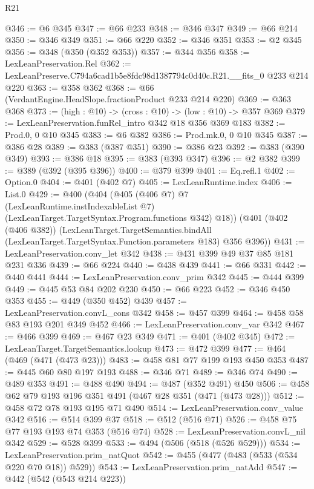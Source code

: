 \begin{lexlean}{R21}
\begin{coremodule}
@346 := @6 @345
@347 := @66 @233
@348 := @346 @347
@349 := @66 @214
@350 := @346 @349
@351 := @66 @220
@352 := @346 @351
@353 := @2 @345
@356 := @348 (@350 (@352 @353))
@357 := @344 @356
@358 := LexLeanPreservation.Rel
@362 := LexLeanPreserve.C794a6cad1b5e8fdc98d1387794c0d40c.R21.__fits_0 @233 @214 @220
@363 := @358 @362
@368 := @66 (VerdantEngine.HeadSlope.fractionProduct @233 @214 @220)
@369 := @363 @368
@373 := (high : @10) -> (cross : @10) -> (low : @10) -> @357 @369
@379 := LexLeanPreservation.funRel_intro @342 @18 @356 @369 @183
@382 := Prod.{0, 0} @10 @345
@383 := @6 @382
@386 := Prod.mk.{0, 0} @10 @345
@387 := @386 @28
@389 := @383 (@387 @351)
@390 := @386 @23
@392 := @383 (@390 @349)
@393 := @386 @18
@395 := @383 (@393 @347)
@396 := @2 @382
@399 := @389 (@392 (@395 @396))
@400 := @379 @399
@401 := Eq.refl.{1}
@402 := Option.{0}
@404 := @401 (@402 @7)
@405 := LexLeanRuntime.index
@406 := List.{0}
@429 := @400
    (@404
      (@405
        (@406 @7)
        @7
        (LexLeanRuntime.instIndexableList @7)
        (LexLeanTarget.TargetSyntax.Program.functions @342)
        @18))
    (@401
      (@402 (@406 @382))
      (LexLeanTarget.TargetSemantics.bindAll
        (LexLeanTarget.TargetSyntax.Function.parameters @183)
        @356
        @396))
@431 := LexLeanPreservation.conv_let @342
@438 := @431 @399 @49 @37 @85 @181 @231 @336
@439 := @66 @224
@440 := @438 @439
@441 := @66 @331
@442 := @440 @441
@444 := LexLeanPreservation.conv_prim @342
@445 := @444 @399
@449 := @445 @53 @84 @202 @230
@450 := @66 @223
@452 := @346 @450 @353
@455 := @449 (@350 @452) @439
@457 := LexLeanPreservation.convL_cons @342
@458 := @457 @399
@464 := @458 @58 @83 @193 @201 @349 @452
@466 := LexLeanPreservation.conv_var @342
@467 := @466 @399
@469 := @467 @23 @349
@471 := @401 (@402 @345)
@472 := LexLeanTarget.TargetSemantics.lookup
@473 := @472 @399
@477 := @464 (@469 (@471 (@473 @23)))
@483 := @458 @81 @77 @199 @193 @450 @353
@487 := @445 @60 @80 @197 @193
@488 := @346 @71
@489 := @346 @74
@490 := @489 @353
@491 := @488 @490
@494 := @487 (@352 @491) @450
@506 := @458 @62 @79 @193 @196 @351 @491 (@467 @28 @351 (@471 (@473 @28)))
@512 := @458 @72 @78 @193 @195 @71 @490
@514 := LexLeanPreservation.conv_value @342
@516 := @514 @399 @37
@518 := @512 (@516 @71)
@526 := @458 @75 @77 @193 @193 @74 @353 (@516 @74)
@528 := LexLeanPreservation.convL_nil @342
@529 := @528 @399
@533 := @494 (@506 (@518 (@526 @529)))
@534 := LexLeanPreservation.prim_natQuot
@542 := @455 (@477 (@483 (@533 (@534 @220 @70 @18)) @529))
@543 := LexLeanPreservation.prim_natAdd
@547 := @442 (@542 (@543 @214 @223))

\end{coremodule}
\end{lexlean}
